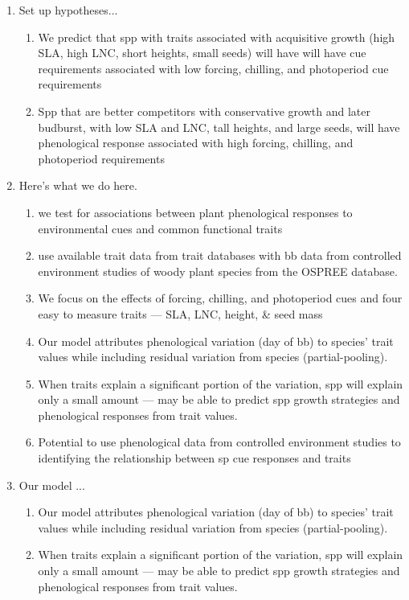\documentclass{article}
\begin{document}
\begin{enumerate}
\item Set up hypotheses...
\begin{enumerate}
\item We predict that spp with traits associated with acquisitive growth (high SLA, high LNC, short heights, small seeds) will have will have cue requirements associated with low forcing, chilling, and photoperiod cue requirements
\item Spp that are better competitors with conservative growth and later budburst, with low SLA and LNC, tall heights, and large seeds, will have phenological response associated with high forcing, chilling, and photoperiod requirements
\end{enumerate}

\item Here's what we do here.
\begin{enumerate}
\item we test for associations between plant phenological responses to environmental cues and common functional traits 
\item use available trait data from trait databases with bb data from controlled environment studies of woody plant species from the OSPREE database.
\item We focus on the effects of forcing, chilling, and photoperiod cues and four easy to measure traits — SLA, LNC, height, \& seed mass
\item Our model attributes phenological variation (day of bb) to species’ trait values while including residual variation from species (partial-pooling).
\item When traits explain a significant portion of the variation, spp will explain only a small amount — may be able to predict spp growth strategies and phenological responses from trait values.
\item Potential to use phenological data from controlled environment studies to identifying the relationship between sp cue responses and traits
\end{enumerate}

\item Our model ...
\begin{enumerate}
\item Our model attributes phenological variation (day of bb) to species’ trait values while including residual variation from species (partial-pooling).
\item When traits explain a significant portion of the variation, spp will explain only a small amount — may be able to predict spp growth strategies and phenological responses from trait values.
\end{enumerate}
\end{enumerate}
\end{document}
